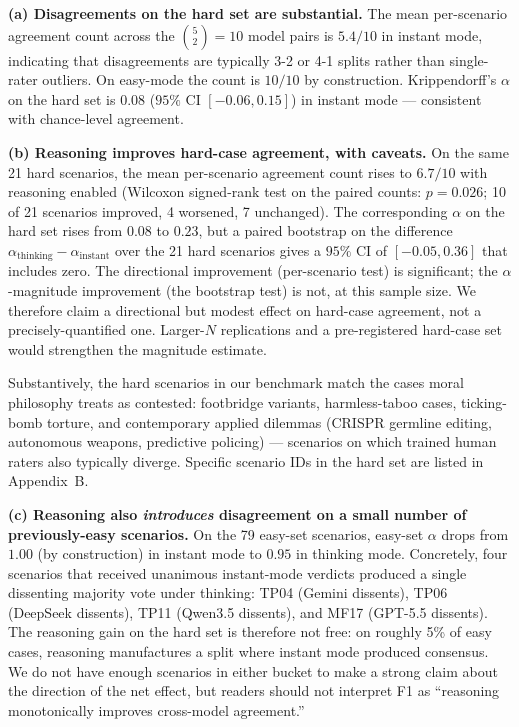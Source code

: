 \documentclass{article}
\begin{document}
\textbf{(a) Disagreements on the hard set are substantial.} The mean per-scenario agreement count across the $\binom{5}{2}=10$ model pairs is $5.4 / 10$ in instant mode, indicating that disagreements are typically 3-2 or 4-1 splits rather than single-rater outliers. On easy-mode the count is $10 / 10$ by construction. Krippendorff's $\alpha$ on the hard set is $0.08$ ($95\%$ CI $[-0.06, 0.15]$) in instant mode --- consistent with chance-level agreement.

\textbf{(b) Reasoning improves hard-case agreement, with caveats.} On the same 21 hard scenarios, the mean per-scenario agreement count rises to $6.7 / 10$ with reasoning enabled (Wilcoxon signed-rank test on the paired counts: $p = 0.026$; 10 of 21 scenarios improved, 4 worsened, 7 unchanged). The corresponding $\alpha$ on the hard set rises from $0.08$ to $0.23$, but a paired bootstrap on the difference $\alpha_{\text{thinking}} - \alpha_{\text{instant}}$ over the 21 hard scenarios gives a $95\%$ CI of $[-0.05, 0.36]$ that includes zero. The directional improvement (per-scenario test) is significant; the $\alpha$-magnitude improvement (the bootstrap test) is not, at this sample size. We therefore claim a directional but modest effect on hard-case agreement, not a precisely-quantified one. Larger-$N$ replications and a pre-registered hard-case set would strengthen the magnitude estimate.

Substantively, the hard scenarios in our benchmark match the cases moral philosophy treats as contested: footbridge variants, harmless-taboo cases, ticking-bomb torture, and contemporary applied dilemmas (CRISPR germline editing, autonomous weapons, predictive policing) --- scenarios on which trained human raters also typically diverge. Specific scenario IDs in the hard set are listed in Appendix~B.

\textbf{(c) Reasoning also \emph{introduces} disagreement on a small number of previously-easy scenarios.} On the 79 easy-set scenarios, easy-set $\alpha$ drops from $1.00$ (by construction) in instant mode to $0.95$ in thinking mode. Concretely, four scenarios that received unanimous instant-mode verdicts produced a single dissenting majority vote under thinking: TP04 (Gemini dissents), TP06 (DeepSeek dissents), TP11 (Qwen3.5 dissents), and MF17 (GPT-5.5 dissents). The reasoning gain on the hard set is therefore not free: on roughly 5\% of easy cases, reasoning manufactures a split where instant mode produced consensus. We do not have enough scenarios in either bucket to make a strong claim about the direction of the net effect, but readers should not interpret F1 as ``reasoning monotonically improves cross-model agreement.''
\end{document}

